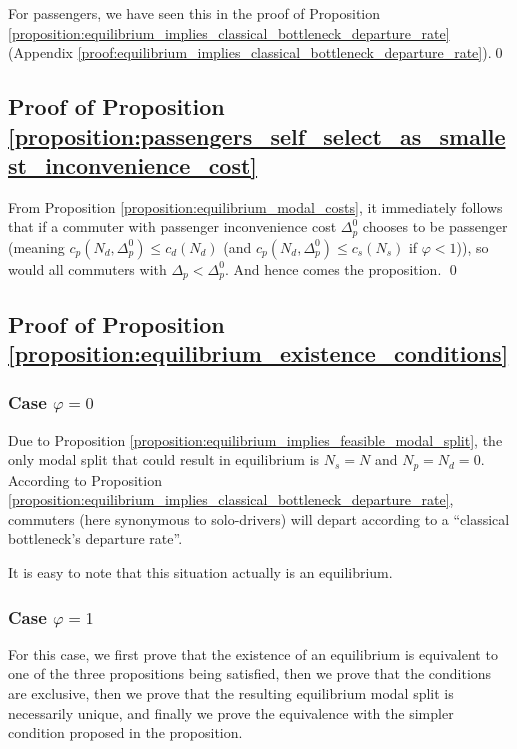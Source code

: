 \documentclass[english, a4paper]{article}
\theoremstyle{plain}
\theoremstyle{definition}
\theoremstyle{remark}
\begin{document}
For passengers, we have seen this in the proof of Proposition \ref{proposition:equilibrium_implies_classical_bottleneck_departure_rate} (Appendix \ref{proof:equilibrium_implies_classical_bottleneck_departure_rate}).\qed

\subsection{Proof of Proposition \ref{proposition:passengers_self_select_as_smallest_inconvenience_cost}}
\label{proof:passengers_self_select_as_smallest_inconvenience_cost}

From Proposition \ref{proposition:equilibrium_modal_costs}, it immediately follows that if a commuter with passenger inconvenience cost $\Delta_p^0$ chooses to be passenger (meaning $c_p(N_d, \Delta_p^0) \leq c_d(N_d)$ (and $c_p(N_d, \Delta_p^0) \leq c_s(N_s)$ if $\varphi < 1$)), so would all commuters with $\Delta_p < \Delta_p^0$. And hence comes the proposition. \qed

\subsection{Proof of Proposition \ref{proposition:equilibrium_existence_conditions}}
\label{proof:equilibrium_existence_conditions}

\subsubsection{Case \texorpdfstring{$\varphi = 0$}{phi = 0}}
Due to Proposition \ref{proposition:equilibrium_implies_feasible_modal_split}, the only modal split that could result in equilibrium is $N_s = N$ and $N_p = N_d = 0$. According to Proposition \ref{proposition:equilibrium_implies_classical_bottleneck_departure_rate}, commuters (here synonymous to solo-drivers) will depart according to a ``classical bottleneck’s departure rate''.

It is easy to note that this situation actually is an equilibrium.

\subsubsection{Case \texorpdfstring{$\varphi = 1$}{phi = 1}}

For this case, we first prove that the existence of an equilibrium is equivalent to one of the three propositions being satisfied, then we prove that the conditions are exclusive, then we prove that the resulting equilibrium modal split is necessarily unique, and finally we prove the equivalence with the simpler condition proposed in the proposition.
\end{document}
